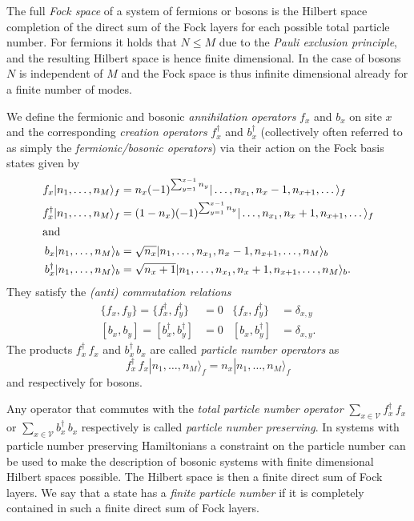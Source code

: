 \documentclass[a4paper,12pt,listof=totoc,index=totoc,bibliography=totoc,headsepline=false,headings=normal,BCOR16.153846mm,DIV12,headinclude,twoside,cleardoublepage=empty,numbers=noenddot,final]{scrreprt}
\theoremstyle{mystyle}
\numberwithin{equation}{section}
\numberwithin{figure}{section}
\numberwithin{lemma}{section}
\numberwithin{theorem}{section}
\numberwithin{corollary}{section}
\numberwithin{definition}{section}
\numberwithin{conjecture}{section}
\numberwithin{observation}{section}
\newcommand{\+}{\mkern2mu}
\newcommand{\Vset}{\mathcal{V}}
\newcommand{\ket}[1]{|#1\rangle}
\newcommand{\ad}{^\dagger}
\DeclareMathOperator{\1}{\mathds{1}}
\begin{document}
The full \emph{Fock space} of a system of fermions or bosons is the Hilbert space completion of the direct sum of the Fock layers for each possible total particle number.
For fermions it holds that $N \leq M$ due to the \emph{Pauli exclusion principle}, and the resulting Hilbert space is hence finite dimensional.
In the case of bosons $N$ is independent of $M$ and the Fock space is thus infinite dimensional already for a finite number of modes.

We define the fermionic and bosonic \emph{annihilation operators} $f_x$ and $b_x$ on site $x$ and the corresponding \emph{creation operators} $f\ad_x$ and $b\ad_x$ (collectively often referred to as simply the \emph{fermionic/bosonic operators}) via their action on the Fock basis states given by
\begin{align}
  f_x \ket{n_1,\dots,n_M}_f &=  n_x (-1)^{\sum_{y=1}^{x-1} n_y} \ket{\dots,n_{x_1},n_x - 1,n_{x+1},\dots}_f \label{eq:fermionicannihilationoperator}\\
  f\ad_x \ket{n_1,\dots,n_M}_f &=  (1-n_x) (-1)^{\sum_{y=1}^{x-1} n_y} \ket{\dots,n_{x_1},n_x + 1,n_{x+1},\dots}_f \\
  \intertext{and}
  b_x \ket{n_1,\dots,n_M}_b &=  \sqrt{n_x} \ket{n_1,\dots,n_{x_1},n_x - 1,n_{x+1},\dots,n_M}_b \label{eq:bosonicannihilationoperator}\\
  b\ad_x \ket{n_1,\dots,n_M}_b &=  \sqrt{n_x+1} \ket{n_1,\dots,n_{x_1},n_x + 1,n_{x+1},\dots,n_M}_b .
\end{align}
They satisfy the \emph{(anti) commutation relations}
\begin{align}
  \{f_x,f_y\} = \{f\ad_x,f\ad_y\} &= 0 & \{f_x,f\ad_y\} &= \delta_{x,y} \\
  [b_x,b_y] = [b\ad_x,b\ad_y] &= 0 & [b_x,b\ad_y] &= \delta_{x,y} . \label{eq:bosonicommutationrelations}
\end{align}
The products $f\ad_x\,f_x$ and $b\ad_x\,b_x$ are called \emph{particle number operators} as
\begin{equation}
  f\ad_x\,f_x \ket{n_1,\dots,n_M}_f = n_x \ket{n_1,\dots,n_M}_f
\end{equation}
and respectively for bosons.

Any operator that commutes with the \emph{total particle number operator} $\sum_{x\in\Vset} f\ad_x\,f_x$ or $\sum_{x\in\Vset}  b\ad_x\,b_x$ respectively is called \emph{particle number preserving}.
In systems with particle number preserving Hamiltonians a constraint on the particle number can be used to make the description of bosonic systems with finite dimensional Hilbert spaces possible.
The Hilbert space is then a finite direct sum of Fock layers.
We say that a state has a \emph{finite particle number} if it is completely contained in such a finite direct sum of Fock layers.
\end{document}
